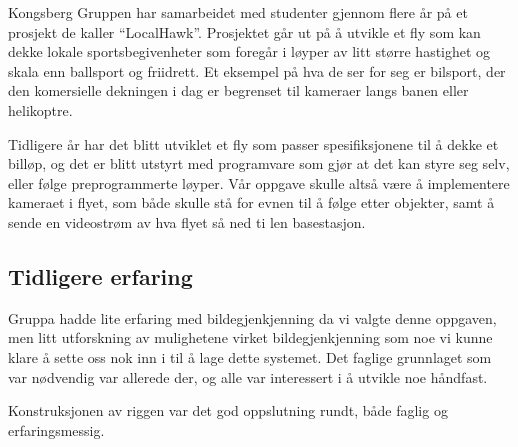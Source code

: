 Kongsberg Gruppen har samarbeidet med studenter gjennom flere år på et prosjekt de kaller ``LocalHawk''. Prosjektet går ut på å utvikle et fly som kan dekke lokale sportsbegivenheter som foregår i løyper av litt større hastighet og skala enn ballsport og friidrett. Et eksempel på hva de ser for seg er bilsport, der den komersielle dekningen i dag er begrenset til kameraer langs banen eller helikoptre. 

Tidligere år har det blitt utviklet et fly som passer spesifiksjonene til å dekke et billøp, og det er blitt utstyrt med programvare som gjør at det kan styre seg selv, eller følge preprogrammerte løyper. Vår oppgave skulle altså være å implementere kameraet i flyet, som både skulle stå for evnen til å følge etter objekter, samt å sende en videostrøm av hva flyet så ned ti len basestasjon.

\subsection{Tidligere erfaring}

Gruppa hadde lite erfaring med bildegjenkjenning da vi valgte denne oppgaven, men litt utforskning av mulighetene virket bildegjenkjenning som noe vi kunne klare å sette oss nok inn i til å lage dette systemet. Det faglige grunnlaget som var nødvendig var allerede der, og alle var interessert i å utvikle noe håndfast.

Konstruksjonen av riggen var det god oppslutning rundt, både faglig og erfaringsmessig. 